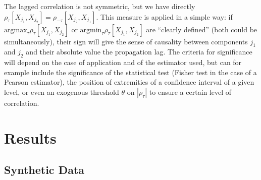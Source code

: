 \documentclass[english]{./sageo}
\begin{document}
The lagged correlation is not symmetric, but we have directly $\rho_{\tau}\left[X_{j_1},X_{j_2}\right] = \rho_{-\tau}\left[X_{j_2},X_{j_1}\right]$. This measure is applied in a simple way: if $\textrm{argmax}_{\tau} \rho_{\tau}\left[X_{j_1},X_{j_2}\right]$ or $\textrm{argmin}_{\tau} \rho_{\tau}\left[X_{j_1},X_{j_2}\right]$ are ``clearly defined'' (both could be simultaneously), their sign will give the sense of causality between components $j_1$ and $j_2$ and their absolute value the propagation lag. The criteria for significance will depend on the case of application and of the estimator used, but can for example include the significance of the statistical test (Fisher test in the case of a Pearson estimator), the position of extremities of a confidence interval of a given level, or even an exogenous threshold $\theta$ on $\left|\rho_{\tau}\right|$ to ensure a certain level of correlation.






\section{Results}


\subsection{Synthetic Data}
\end{document}
